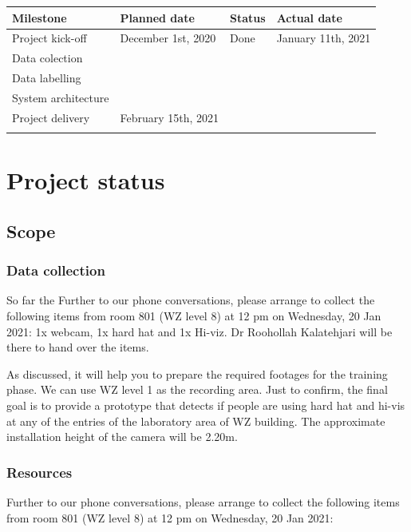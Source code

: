 \documentclass{article}
\begin{document}
\begin{center}
\begin{tabular}{llll}
Milestone & Planned date & Status & Actual date\\
\hline
Project kick-off & December 1st, 2020 & Done & January 11th, 2021\\
Data colection &  &  & \\
Data labelling &  &  & \\
System architecture &  &  & \\
Project delivery & February 15th, 2021 &  & \\
 &  &  & \\
\end{tabular}
\end{center}

\section{Project status}
\label{sec:org0c03505}

\subsection{Scope}
\label{sec:org60388f6}

\subsubsection{Data collection}
\label{sec:orga2b7867}
    So far the Further to our phone conversations, please arrange to collect the following items from room 801 (WZ level 8) at 12 pm on Wednesday, 20 Jan 2021:
1x webcam,
1x hard hat and
1x Hi-viz.
Dr Roohollah Kalatehjari will be there to hand over the items.

As discussed, it will help you to prepare the required footages for the training phase. We can use WZ level 1 as the recording area. Just to confirm, the final goal is to provide a prototype that detects if people are using hard hat and hi-vis at any of the entries of the laboratory area of WZ building. The approximate installation height of the camera will be 2.20m.


\subsubsection{Resources}
\label{sec:orgf3129b1}
Further to our phone conversations, please arrange to collect the following items from room 801 (WZ level 8) at 12 pm on Wednesday, 20 Jan 2021:
\end{document}
